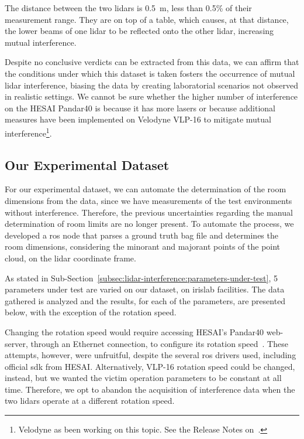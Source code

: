 The distance between the two \acp{lidar} is \SI{0.5}{\meter}, less than 0.5\% of their measurement range. They are on top of a table, which causes, at that distance, the lower beams of one \ac{lidar} to be reflected onto the other \ac{lidar}, increasing mutual interference.

Despite no conclusive verdicts can be extracted from this data, we can affirm that the conditions under which this dataset is taken fosters the occurrence of mutual \ac{lidar} interference, biasing the data by creating laboratorial scenarios not observed in realistic settings. We cannot be sure whether the higher number of interference on the HESAI Pandar40 is because it has more lasers or because additional measures have been implemented on Velodyne VLP-16 to mitigate mutual interference\footnote{Velodyne as been working on this topic. See the Release Notes on~\cite{vlp16}.}. 

\subsection{Our Experimental Dataset}
\label{subsec:lidar-interference:room-outliers-experimental-setup}
For our experimental dataset, we can automate the determination of the room dimensions from the data, since we have measurements of the test environments without interference. Therefore, the previous uncertainties regarding the manual determination of room limits are no longer present. To automate the process, we developed a \ac{ros} node that parses a ground truth bag file and determines the room dimensions, considering the minorant and majorant points of the point cloud, on the \ac{lidar} coordinate frame. 

As stated in Sub-Section~\ref{subsec:lidar-interference:parameters-under-test}, 5 parameters under test are varied on our dataset, on \ac{irislab} facilities. The data gathered is analyzed and the results, for each of the parameters, are presented below, with the exception of the rotation speed.

Changing the rotation speed would require accessing HESAI's Pandar40 web-server, through an Ethernet connection, to configure its rotation speed~\cite{Pandar40UserGuide}. These attempts, however, were unfruitful, despite the several \ac{ros} drivers used, including official \ac{sdk} from HESAI\cp. Alternatively, VLP-16 rotation speed could be changed, instead, but we wanted the victim operation parameters to be constant at all time. Therefore, we opt to abandon the acquisition of interference data when the two \acp{lidar} operate at a different rotation speed.

